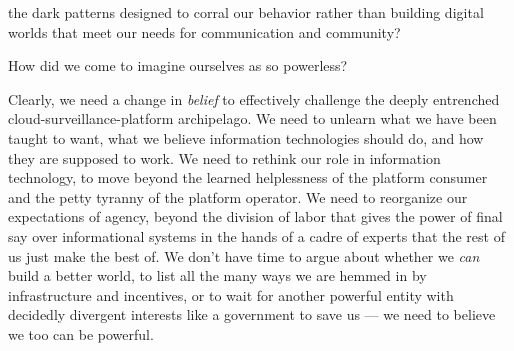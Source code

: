 the dark patterns designed to corral our behavior rather than building
digital worlds that meet our needs for communication and community?

How did we come to imagine ourselves as so powerless?

Clearly, we need a change in \emph{belief} to effectively challenge the
deeply entrenched cloud-surveillance-platform archipelago. We need to
unlearn what we have been taught to want, what we believe information
technologies should do, and how they are supposed to work. We need to
rethink our role in information technology, to move beyond the learned
helplessness of the platform consumer and the petty tyranny of the
platform operator. We need to reorganize our expectations of agency,
beyond the division of labor that gives the power of final say over
informational systems in the hands of a cadre of experts that the rest
of us just make the best of. We don't have time to argue about whether
we \emph{can} build a better world, to list all the many ways we are hemmed in by
infrastructure and incentives, or to wait for another powerful entity
with decidedly divergent interests like a government to save us --- we need to
believe we too can be powerful.

